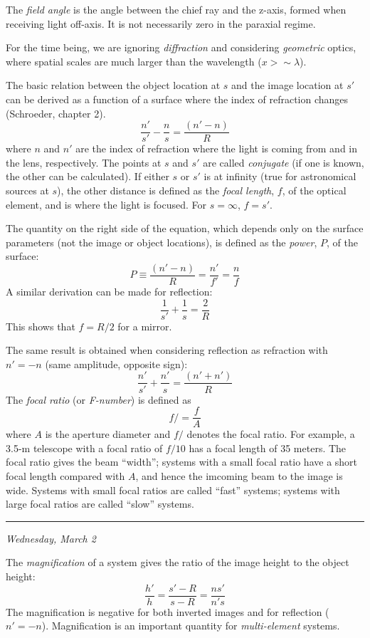 \documentclass[12pt]{article}
\newcommand{\mydate}[1]{
    \begin{flushright}
        \rule{\textwidth}{0.4pt} %
        \small\hfill\textit{#1}
    \end{flushright}}
\begin{document}
The \textit{field angle} is the angle between the chief ray and the z-axis,
formed when receiving light off-axis. It is not necessarily zero in the
paraxial regime.

For the time being, we are ignoring \textit{diffraction} and considering
\textit{geometric} optics, where spatial scales are much larger than the
wavelength ($x > \sim\lambda$).

The basic relation between the object location at $s$ and the image location at
$s'$ can be derived as a function of a surface where the index of refraction
changes (Schroeder, chapter 2).
\[
    \frac{n'}{s'}-\frac{n}{s} = \frac{(n'-n)}{R}
    \]
where $n$ and $n'$ are the index of refraction where the light is coming from
and in the lens, respectively. The points at $s$ and $s'$ are called
\textit{conjugate} (if one is known, the other can be calculated). If either $s$
or $s'$ is at infinity (true for astronomical sources at $s$), the other
distance is defined as the \textit{focal length}, $f$, of the optical element,
and is where the light is focused. For $s=\infty$, $f=s'$.

The quantity on the right side of the equation, which depends only on the
surface parameters (not the image or object locations), is defined as the
\textit{power}, $P$, of the surface:
\[
     P \equiv \frac{(n'-n)}{R} = \frac{n'}{f'} = \frac{n}{f}
    \]
A similar derivation can be made for reflection:
\[
     \frac{1}{s'} + \frac{1}{s} = \frac{2}{R}
    \]
This shows that $f = R/2$ for a mirror.

The same result is obtained when considering reflection as refraction with $n'
= -n$ (same amplitude, opposite sign):
\[
    \frac{n'}{s'}+\frac{n'}{s} = \frac{(n'+n')}{R}
    \]
The \textit{focal ratio} (or \textit{F-number}) is defined as
\[
    f/ = \frac{f}{A}
    \]
where $A$ is the aperture diameter and $f/$ denotes the focal ratio. For
example, a 3.5-m telescope with a focal ratio of $f /10$ has a focal length of
35 meters. The focal ratio gives the beam ``width''; systems with a small focal
ratio have a short focal length compared with $A$, and hence the imcoming beam
to the image is wide. Systems with small focal ratios are called ``fast''
systems; systems with large focal ratios are called ``slow'' systems.

\mydate{Wednesday, March 2}

The \textit{magnification} of a system gives the ratio of the image height to
the object height:
\[
    \frac{h'}{h} = \frac{s'-R}{s-R} = \frac{ns'}{n's}
    \]
The magnification is negative for both inverted images and for reflection
($n' = -n$). Magnification is an important quantity for
\textit{multi-element} systems.
\end{document}
